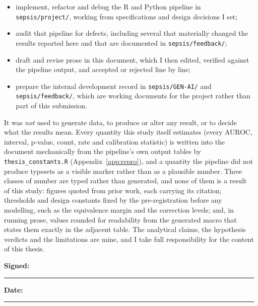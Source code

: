 \begin{itemize}
    \item implement, refactor and debug the R and Python pipeline in
    \texttt{sepsis/\allowbreak project/}, working from specifications and
    design decisions I set;

    \item audit that pipeline for defects, including several that materially
    changed the results reported here and that are documented in
    \texttt{sepsis/feedback/};

    \item draft and revise prose in this document, which I then edited,
    verified against the pipeline output, and accepted or rejected line by
    line;

    \item prepare the internal development record in
    \texttt{sepsis/GEN-AI/} and \texttt{sepsis/feedback/}, which are working
    documents for the project rather than part of this submission.
\end{itemize}

It was \emph{not} used to generate data, to produce or alter any result, or to
decide what the results mean. Every quantity this study itself estimates
(every AUROC, interval, p-value, count, rate and calibration statistic) is
written into the document mechanically from the pipeline's own output tables by
\texttt{thesis\_constants.R} (Appendix~\ref{app:repro}), and a quantity the
pipeline did not produce typesets as a visible marker rather than as a
plausible number. Three classes of number are typed rather than generated, and
none of them is a result of this study: figures quoted from prior work, each
carrying its citation; thresholds and design constants fixed by the
pre-registration before any modelling, such as the equivalence margin and the
correction levels; and, in running prose, values rounded for readability from
the generated macro that states them exactly in the adjacent table. The
analytical claims, the hypothesis verdicts and the limitations are mine, and I
take full responsibility for the content of this thesis.

\vspace{1.5em}
\noindent\textbf{Signed:} \rule{6cm}{0.4pt} \hfill \textbf{Date:} \rule{3cm}{0.4pt}

\vspace{0.5em}
\noindent\reportauthor

